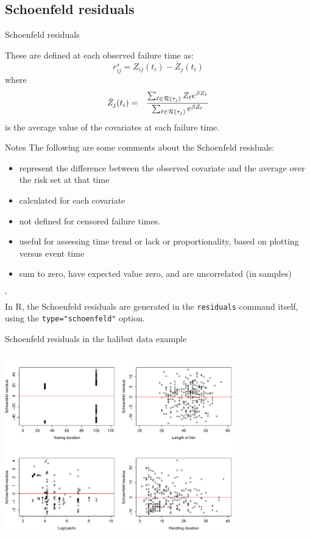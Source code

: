 \documentclass[envcountsect, 10pt, portrait, palatino]{beamer}
\begin{document}
\subsection{Schoenfeld residuals}
\begin{frame}{Schoenfeld residuals}

These are defined at each observed failure time as:
\[r_{ij}^s=Z_{ij}(t_i)-\bar{Z}_j(t_i)\]
where
\begin{eqnarray*} \bar{Z}_j(t_i) & = & \frac{ \sum_{\ell \in {\cal R}(\tau_j)}
Z_\ell e^{\beta Z_\ell}}{\sum_{\ell \in {\cal R}(\tau_j)}
e^{\beta  Z_\ell} }
\end{eqnarray*}
is the average value of the covariates at each failure time.
\end{frame}
\begin{frame}{Notes}
The following are some comments about the Schoenfeld residuals:
\begin{itemize}
\item represent the difference between the observed covariate
and the average over the risk set at that time
\item calculated for each covariate
\item not defined for censored
failure times.
\item useful for assessing time trend or lack or proportionality,
based on plotting versus event time
\item sum to zero, have expected value zero, and
are uncorrelated (in  samples)
\end{itemize}
`\\[2ex]
In R, the Schoenfeld residuals are generated in the {\tt residuals}
command itself, using the {\tt type="schoenfeld"} option.
\end{frame}

\begin{frame}{Schoenfeld residuals in the halibut data example}
\vspace*{-.1in}
\centerline{\includegraphics[width=4in]{sch_res.pdf}}
\end{frame}
\end{document}
